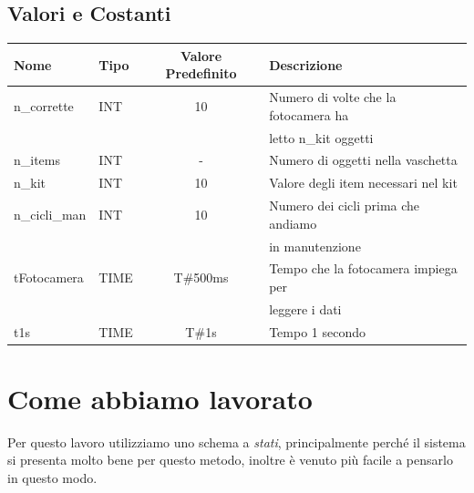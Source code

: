 \documentclass{article}
\begin{document}
\subsection{Valori e Costanti}
\begin{center}
    \begin{tabular}{l l c l}
        \toprule
        \textbf{Nome} & \textbf{Tipo} & \textbf{Valore Predefinito} & \textbf{Descrizione}                   \\
        \midrule
        \midrule

        n\_corrette   & INT           & 10                          & Numero di volte che la fotocamera ha   \\
                      &               &                             & letto n\_kit  oggetti                  \\
        \midrule

        n\_items      & INT           & -                           & Numero di oggetti nella vaschetta      \\
        \midrule

        n\_kit        & INT           & 10                          & Valore degli item necessari nel kit    \\
        \midrule
        n\_cicli\_man & INT           & 10                          & Numero dei cicli prima che andiamo \\
                      &               &                             & in manutenzione                        \\
        \midrule

        tFotocamera   & TIME          & T\#500ms                    & Tempo che la fotocamera impiega per    \\
                      &               &                             & leggere i dati                         \\
        \midrule
        t1s           & TIME          & T\#1s                       & Tempo 1 secondo                        \\

        \bottomrule
    \end{tabular}
\end{center}

\section{Come abbiamo lavorato}
Per questo lavoro utilizziamo uno schema a \textit{stati}, principalmente perché il sistema si presenta molto bene per questo metodo, inoltre è venuto più facile a pensarlo in questo modo.
\\
\end{document}
